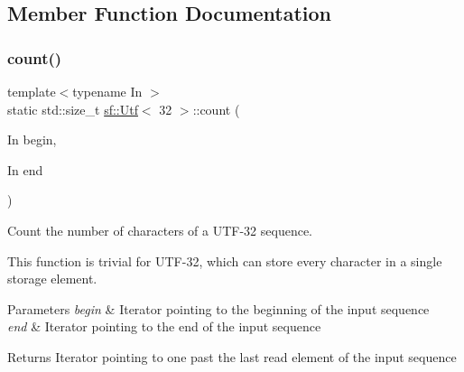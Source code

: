 \subsection{Member Function Documentation}
\mbox{\label{classsf_1_1_utf_3_0132_01_4_a9b18c32b9e6d4b3126e9b4af45988b55}} 
\subsubsection{\texorpdfstring{count()}{count()}}
{\footnotesize\ttfamily template$<$typename In $>$ \\
static std\+::size\+\_\+t \mbox{\hyperlink{classsf_1_1_utf}{sf\+::\+Utf}}$<$ 32 $>$\+::count (\begin{DoxyParamCaption}\item[{In}]{begin,  }\item[{In}]{end }\end{DoxyParamCaption})\hspace{0.3cm}{\ttfamily [static]}}



Count the number of characters of a U\+T\+F-\/32 sequence. 

This function is trivial for U\+T\+F-\/32, which can store every character in a single storage element.


\begin{DoxyParams}{Parameters}
{\em begin} & Iterator pointing to the beginning of the input sequence \\
\hline
{\em end} & Iterator pointing to the end of the input sequence\\
\hline
\end{DoxyParams}
\begin{DoxyReturn}{Returns}
Iterator pointing to one past the last read element of the input sequence \begin{DoxyVerb}\end{DoxyVerb}
 
\end{DoxyReturn}
\mbox{\label{classsf_1_1_utf_3_0132_01_4_ad754ce8476f7b80563890dec12cefd46}} 
